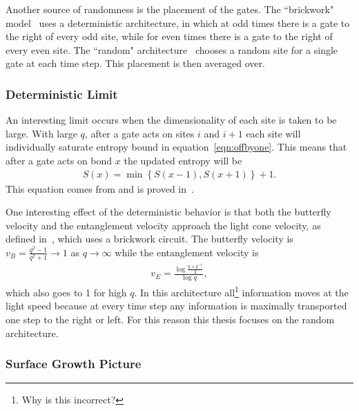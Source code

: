 Another source of randomness is the placement of the gates. The ``brickwork" model~\cite{Keyserlingk} uses a deterministic architecture, in which at odd times there is a gate to the right of every odd site, while for even times there is a gate to the right of every even site. The ``random" architecture~\cite{Nahum2017} chooses a random site for a single gate at each time step. This placement is then averaged over.



\subsubsection{Deterministic Limit} \emph{} \label{subsub:determ}

An interesting limit occurs when the dimensionality of each site is taken to be large. With large $q$, after a gate acts on sites $i$ and $i+1$ each site will individually saturate entropy bound in equation~\ref{eqn:offbyone}. This means that after a gate acts on bond $x$ the updated entropy will be 
\begin{align}
S(x) = \min\left\lbrace S(x-1), S(x+1)\right\rbrace + 1.\label{eqn:update}
\end{align}
This equation comes from and is proved in~\cite{Nahum2017}.

One interesting effect of the deterministic behavior is that both the butterfly velocity and the entanglement velocity approach the light cone velocity, as defined in~\cite{Keyserlingk}, which uses a brickwork circuit. The butterfly velocity is $v_B = \frac{q^2-1}{q^2+1} \to 1$ as $q\to \infty$ while the entanglement velocity is 
\begin{align}
v_E = \frac{\log\frac{q+q^{-1}}{2}}{\log q},
\end{align}
which also goes to 1 for high $q$. In this architecture all\footnote{Why is this incorrect?} information moves at the light speed because at every time step any information is maximally transported one step to the right or left. For this reason this thesis focuses on the random architecture.

\subsubsection{Surface Growth Picture} \emph{} \label{subsub:surfgrowth}

